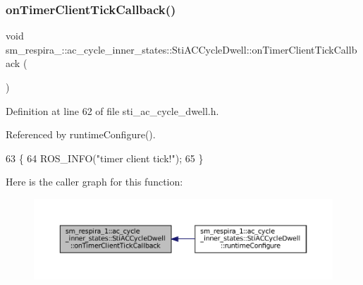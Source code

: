 \subsubsection{\texorpdfstring{on\+Timer\+Client\+Tick\+Callback()}{onTimerClientTickCallback()}}
{\footnotesize\ttfamily void sm\+\_\+respira\+\_\+::ac\+\_\+cycle\+\_\+inner\+\_\+states\+::\+Sti\+A\+C\+Cycle\+Dwell\+::on\+Timer\+Client\+Tick\+Callback (\begin{DoxyParamCaption}{ }\end{DoxyParamCaption})\hspace{0.3cm}{\ttfamily [inline]}}



Definition at line 62 of file sti\+\_\+ac\+\_\+cycle\+\_\+dwell.\+h.



Referenced by runtime\+Configure().


\begin{DoxyCode}
63   \{
64     ROS\_INFO(\textcolor{stringliteral}{"timer client tick!"});
65   \}
\end{DoxyCode}
Here is the caller graph for this function\+:
\nopagebreak
\begin{figure}[H]
\begin{center}
\leavevmode
\includegraphics[width=350pt]{structsm__respira__1_1_1ac__cycle__inner__states_1_1StiACCycleDwell_a8543bc0af22558db94fffb3f89d52816_icgraph}
\end{center}
\end{figure}
\mbox{\label{structsm__respira__1_1_1ac__cycle__inner__states_1_1StiACCycleDwell_a64ecc796ff46fff1b6f285c0b6846cd6}} 
